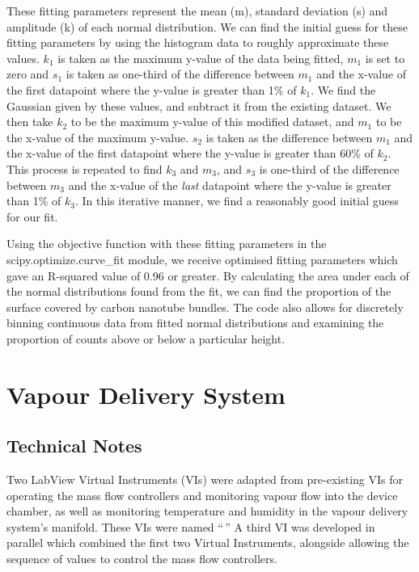 \documentclass[
  a4paper,
]{scrbook}
\begin{document}
These fitting parameters represent the mean (m), standard deviation (s)
and amplitude (k) of each normal distribution. We can find the initial
guess for these fitting parameters by using the histogram data to
roughly approximate these values. \(k_1\) is taken as the maximum
y-value of the data being fitted, \(m_1\) is set to zero and \(s_1\) is
taken as one-third of the difference between \(m_1\) and the x-value of
the first datapoint where the y-value is greater than 1\% of \(k_1\). We
find the Gaussian given by these values, and subtract it from the
existing dataset. We then take \(k_2\) to be the maximum y-value of this
modified dataset, and \(m_1\) to be the x-value of the maximum y-value.
\(s_2\) is taken as the difference between \(m_1\) and the x-value of
the first datapoint where the y-value is greater than 60\% of \(k_2\).
This process is repeated to find \(k_3\) and \(m_3\), and \(s_3\) is
one-third of the difference between \(m_3\) and the x-value of the
\emph{last} datapoint where the y-value is greater than 1\% of \(k_3\).
In this iterative manner, we find a reasonably good initial guess for
our fit.

Using the objective function with these fitting parameters in the
scipy.optimize.curve\_fit module, we receive optimised fitting
parameters which gave an R-squared value of 0.96 or greater. By
calculating the area under each of the normal distributions found from
the fit, we can find the proportion of the surface covered by carbon
nanotube bundles. The code also allows for discretely binning continuous
data from fitted normal distributions and examining the proportion of
counts above or below a particular height.

\hypertarget{vapour-delivery-system}{%
\chapter{Vapour Delivery System}\label{vapour-delivery-system}}

\hypertarget{technical-notes}{%
\section{Technical Notes}\label{technical-notes}}

Two LabView Virtual Instruments (VIs) were adapted from pre-existing VIs
for operating the mass flow controllers and monitoring vapour flow into
the device chamber, as well as monitoring temperature and humidity in
the vapour delivery system's manifold. These VIs were named ``\,'' A
third VI was developed in parallel which combined the first two Virtual
Instruments, alongside allowing the sequence of values to control the
mass flow controllers.
\end{document}
